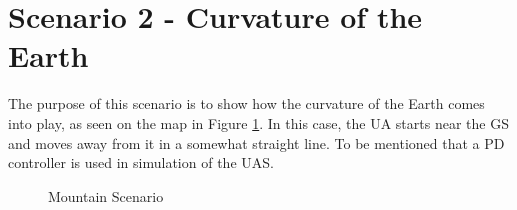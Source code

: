 \section{Scenario 2 - Curvature of the Earth}\label{sec:scenario2}
The purpose of this scenario is to show how the curvature of the Earth comes into play, as seen on the map in Figure \ref{fig:s2_map}. In this case, the UA starts near the GS and moves away from it in a somewhat straight line. To be mentioned that a PD controller is used in simulation of the UAS.

\begin{figure}[H]
	\hfill
	\hfill
	\hfill
	\caption{Mountain Scenario}
	\label{fig:s2_map}
\end{figure}


